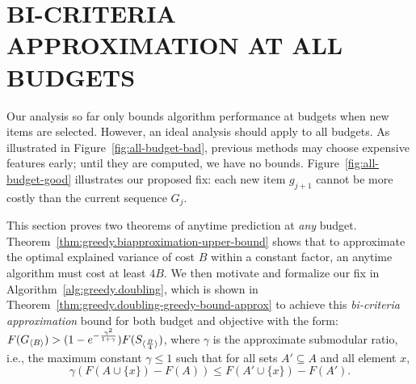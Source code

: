         
        


\section{BI-CRITERIA APPROXIMATION AT ALL BUDGETS}
\label{sec:gomp_bi_criteria}

Our analysis so far only bounds algorithm performance at 
budgets when new items are selected. However, an ideal analysis
should apply to all budgets. As illustrated in Figure~\ref{fig:all-budget-bad},
previous methods may choose expensive features early; 
until they are computed, we have no bounds. 
Figure~\ref{fig:all-budget-good} illustrates our proposed fix: each 
new item $g_{j+1}$ cannot be more costly than the current sequence $G_{j}$. 

This section proves two theorems of anytime prediction at \textit{any} budget.  Theorem~\ref{thm:greedy.biapproximation-upper-bound} shows that
 to approximate the optimal explained variance 
of cost $B$ within a constant factor,
an anytime algorithm must cost at least $4B$. 
We then motivate and formalize our fix in Algorithm~\ref{alg:greedy.doubling},
which is shown in
Theorem~\ref{thm:greedy.doubling-greedy-bound-approx} to achieve this
\textit{bi-criteria approximation} bound for both budget and objective with
the form: \mbox{$F(G_{\langle B \rangle}) > (1 - e^{-\frac{\gamma^2}{1+\gamma}}) F(S_{\langle \frac{B}{4} \rangle})$}, where $\gamma$ is the approximate submodular
ratio, i.e., the maximum constant $\gamma \leq 1$ such that for 
all sets $ A' \subseteq A$ and all element $x$,
\begin{equation}
\label{def:greedy.approx-submodularity}
    \gamma (F(A \cup \{x\}) - F(A)) \leq F(A' \cup \{x\}) - F(A').
\end{equation}

